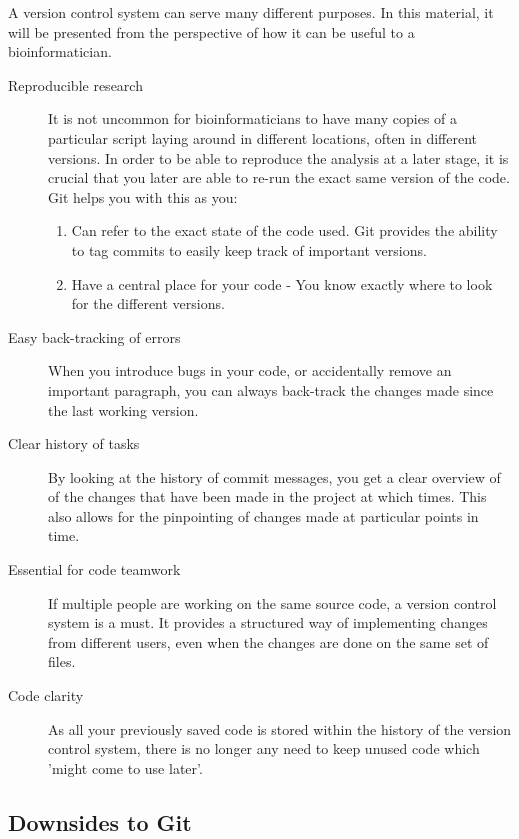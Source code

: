 \documentclass[../main/git_course_main.tex]{subfiles}
\begin{document}
A version control system can serve many different purposes. 
In this material, it will be presented from the perspective of how it can be useful to a bioinformatician.

\begin{description}
\item[Reproducible research] It is not uncommon for bioinformaticians to have many copies of a particular script laying around in different locations, often in different versions. In order to be able to reproduce the analysis at a later stage, it is crucial that you later are able to re-run the exact same version of the code.
Git helps you with this as you:
	
\begin{enumerate}
	\item Can refer to the exact state of the code used. Git provides the ability to tag commits to easily keep track of important versions.	
	\item Have a central place for your code - You know exactly where to look for the different versions.
\end{enumerate}
	
\item[Easy back-tracking of errors] When you introduce bugs in your code, or accidentally remove an important paragraph, you can always back-track the changes made since the last working version. 

\item[Clear history of tasks] By looking at the history of commit messages, you get a clear overview of of the changes that have been made in the project at which times. This also allows for the pinpointing of changes made at particular points in time.

\item[Essential for code teamwork] If multiple people are working on the same source code, a version control system is a must. It provides a structured way
of implementing changes from different users, even when the changes are done on the same set of files.

\item[Code clarity] As all your previously saved code is stored within the history of the version control system, there is no longer any need to keep unused code which 'might come to use later'.
\end{description}

\subsection{Downsides to Git}
\end{document}

